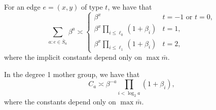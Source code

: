 \documentclass[10pt,a4paper]{amsart}
\begin{document}
\begin{lemma}\label{L:cutset_count}
  For an edge $e=(x,y)$ of type $t$, we have that
  \[
  \sum_{a : e\in \bar S_a} \beta^a \asymp
  \begin{cases}
    \beta^x & t=-1 \text{ or } t=0, \\
    \beta^x \prod_{i\leq\ell_0} (1+\beta_i) & t=1, \\
    \beta^x \prod_{i\leq\ell_1} (1+\beta_i) & t=2,
  \end{cases}
  \]
  where the implicit constants depend only on $\max \bar m$.
\end{lemma}

\begin{lemma}\label{L:C_a_1}
  In the degree 1 mother group, we have that
  \[ C_a \asymp \beta^{-a} \prod_{i<\log_2 a} (1+\beta_i), \]
  where the constants depend only on $\max \bar m$.
\end{lemma}
\end{document}
